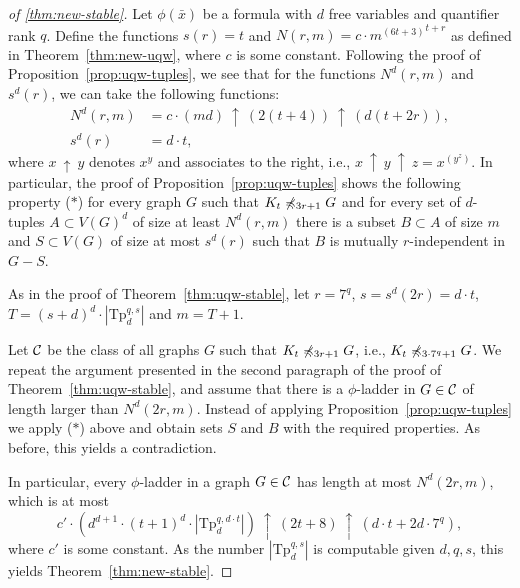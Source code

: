 \begin{proof}[of \cref{thm:new-stable}]
	Let $\phi(\bar x)$ be a formula with $d$ free variables and quantifier rank $q$.
 Define the functions
	$s(r)=t$ and $N(r,m)=c\cdot {m^{(6t+3)}}^{t+r}$ as defined in Theorem~\ref{thm:new-uqw},
	where $c$ is some constant. 
	Following the proof of Proposition~\ref{prop:uqw-tuples}, we see that for the functions $N^d(r,m)$ and $s^d(r)$, we can take the following functions:%
		\newcommand{\pow}{\ \uparrow\ }%
	\begin{align*}
	 N^d(r,m)&= c\cdot (m d)\pow(2(t+4))\pow(d(t+2r)),\\
	  s^d(r)&= d\cdot t,
	\end{align*}
where $x\pow y$ denotes $x^y$ and associates to the right, i.e., $x\pow y\pow z=x^(y^z)$.
In particular, the proof of Proposition~\ref{prop:uqw-tuples} shows the following property
($\ast$)
for every graph $G$ such that $K_t\not\minor_{3r+1} G$ 
and for every set of $d$-tuples $A\subset V(G)^d$ of size at least $N^d(r,m)$
there is a subset $B\subset A$ of size $m$ and $S\subset V(G)$ of size at most $s^d(r)$
such that $B$ is mutually $r$-independent in $G-S$.

	
As in the proof of Theorem~\ref{thm:uqw-stable}, let $r=7^q$,  
$s=s^d(2r)=d\cdot t$,  $T=(s+d)^d\cdot |\mathrm{Tp}_d^{q,s}|$ and $m=T+1$.



Let $\cal C$ be the class of all graphs $G$
such that $K_t\not\minor_{3r+1} G$, i.e., $K_t\not\minor_{3\cdot 7^q+1} G$. We repeat the argument presented in the second paragraph of the proof of Theorem~\ref{thm:uqw-stable}, and assume that there is a $\phi$-ladder in $G\in \cal C$ of length larger than $N^d(2r,m)$.
 Instead of applying Proposition~\ref{prop:uqw-tuples} we apply  ($\ast$) above
and obtain sets  $S$ and $B$ with the required properties. As before, this yields a contradiction. 


In particular, every $\phi$-ladder in a graph $G\in \cal C$ has length at most $N^d(2r,m)$, 
which is at most $$c'\cdot (d^{d+1}\cdot (t+1)^d\cdot |\mathrm{Tp}_d^{q,d\cdot t}|)\pow(2t+8)\pow(d\cdot t+2d\cdot 7^q),$$
where $c'$ is some constant.
As the number $|\mathrm{Tp}_d^{q,s}|$ is computable given $d,q,s$, this 
 yields Theorem~\ref{thm:new-stable}.
\end{proof}
